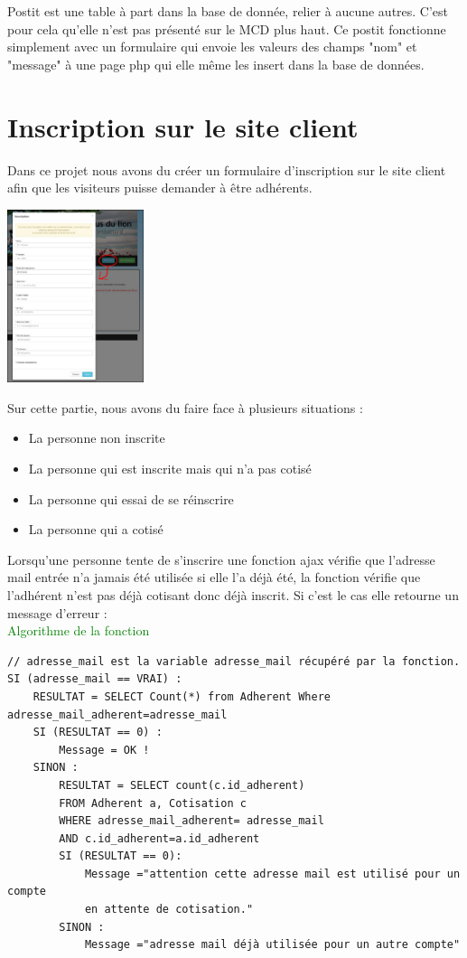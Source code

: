 \documentclass[11pt,a4paper,titlepage]{report}
\begin{document}
Postit est une table à part dans la base de donnée, relier à aucune autres. C'est pour cela qu'elle n'est pas présenté sur le MCD plus haut.
Ce postit fonctionne simplement avec un formulaire qui envoie les valeurs des champs "nom" et "message" à une page php qui elle même les insert dans la base de données. 

\section{Inscription sur le site client}
Dans ce projet nous avons du créer un formulaire d'inscription sur le site client afin que les visiteurs puisse demander à être adhérents. 

\begin{center}
\includegraphics[width=0.3\textwidth]{inscr.jpg}~
\end{center}

Sur cette partie, nous avons du faire face à plusieurs situations : 
\begin{itemize}
\item La personne non inscrite
\item La personne qui est inscrite mais qui n'a pas cotisé
\item La personne qui essai de se réinscrire
\item La personne qui a cotisé
\end{itemize}

Lorsqu'une personne tente de s'inscrire une fonction ajax vérifie que l'adresse mail entrée n'a jamais été utilisée si elle l'a déjà été, la fonction vérifie que l'adhérent n'est pas déjà cotisant donc déjà inscrit. Si c'est le cas elle retourne un message d'erreur :
\\
\textcolor{green}{Algorithme de la fonction}
\begin{verbatim}
// adresse_mail est la variable adresse_mail récupéré par la fonction.
SI (adresse_mail == VRAI) :
    RESULTAT = SELECT Count(*) from Adherent Where    	adresse_mail_adherent=adresse_mail
    SI (RESULTAT == 0) :
        Message = OK ! 
    SINON :
        RESULTAT = SELECT count(c.id_adherent)
        FROM Adherent a, Cotisation c
        WHERE adresse_mail_adherent= adresse_mail 
        AND c.id_adherent=a.id_adherent
        SI (RESULTAT == 0):
            Message ="attention cette adresse mail est utilisé pour un compte
            en attente de cotisation." 
        SINON :
            Message ="adresse mail déjà utilisée pour un autre compte"
		
\end{verbatim}
\end{document}
